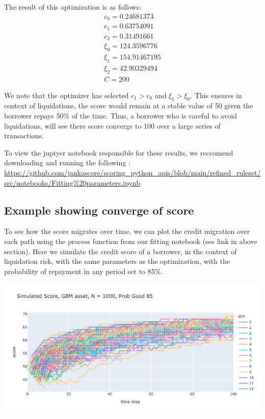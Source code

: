 \documentclass{article}
\begin{document}
The result of this optimization is as follows:
\begin{align}
c_0 = 0.24681373 \\  
c_1 = 0.63754091 \\  
c_2 = 0.31491661 \\  
\xi_0 = 124.3596776 \\
\xi_1 = 154.91467195 \\
\xi_2 = 42.90329494 \\
C = 200
\end{align}

We note that the optimizer has selected $c_1 > c_0$ and $\xi_1 > \xi_0$. This ensures in context of liquidations, the score would remain at a stable value of 50 given the borrower repays 50\% of the time. Thus, a borrower who is careful to avoid liquidations, will see there score converge to 100 over a large series of transactions.

To view the juptyer notebook responsible for these results, we reccomend downloading and running the following : \url{https://github.com/jankascore/scoring_python_apis/blob/main/refined\_ruleset/src/notebooks/Fitting%20parameters.ipynb}

\subsection{Example showing converge of score}

To see how the score migrates over time, we can plot the credit migration over each path using the process function from our fitting notebook (see link in above section). Here we simulate the credit score of a borrower, in the context of liquidation risk, with the same parameters as the optimization, with the probability of repayment in any period set to 85\%.

\includegraphics[scale = 0.4]{p85.png}
\end{document}
